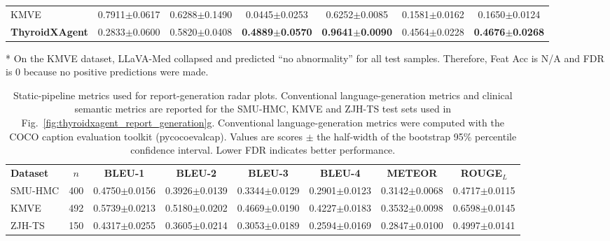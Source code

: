 \documentclass[fleqn,10pt]{wlscirep}
\begin{document}
\begin{appendices}
\begin{table}[p]
\begin{threeparttable}
\begin{tabular}{lcccccc}
KMVE~\cite{li_ultrasound_2024}
& 0.7911$\pm$0.0617
& 0.6288$\pm$0.1490
& 0.0445$\pm$0.0253
& 0.6252$\pm$0.0085
& 0.1581$\pm$0.0162
& 0.1650$\pm$0.0124 \\

\rowcolor{lightgray}
\textbf{ThyroidXAgent}
& 0.2833$\pm$0.0600
& 0.5820$\pm$0.0408
& \textbf{0.4889$\pm$0.0570}
& \textbf{0.9641$\pm$0.0090}
& 0.4564$\pm$0.0228
& \textbf{0.4676$\pm$0.0268} \\

\bottomrule
\end{tabular}

\begin{tablenotes}[flushleft]
\footnotesize
\item[*] On the KMVE dataset, LLaVA-Med collapsed and predicted
``no abnormality'' for all test samples. Therefore, Feat Acc is N/A
and FDR is 0 because no positive predictions were made.
\end{tablenotes}

\end{threeparttable}
\end{table}
\clearpage

\begin{table}[p]
\centering
\begin{threeparttable}

\caption{Static-pipeline metrics used for report-generation radar plots. Conventional language-generation metrics and clinical semantic metrics are reported for the SMU-HMC, KMVE and ZJH-TS test sets used in Fig.~\ref{fig:thyroidxagent_report_generation}g. Conventional language-generation metrics were computed with the COCO caption evaluation toolkit (pycocoevalcap). Values are scores $\pm$ the half-width of the bootstrap 95\% percentile confidence interval. Lower FDR indicates better performance.}
\label{tab:static_rule_controller_radar_metrics}

\scriptsize
\setlength{\tabcolsep}{4.2pt}
\renewcommand{\arraystretch}{1.10}

\begin{tabular}{lccccccc}
\toprule
\rowcolor{gray!20}
\multicolumn{8}{c}{\textbf{Conventional natural-language generation metrics}} \\
\midrule
\textbf{Dataset}
& \textbf{\(n\)}
& \textbf{BLEU-1}
& \textbf{BLEU-2}
& \textbf{BLEU-3}
& \textbf{BLEU-4}
& \textbf{METEOR}
& \textbf{ROUGE$_L$} \\
\midrule
SMU-HMC
& 400
& 0.4750$\pm$0.0156
& 0.3926$\pm$0.0139
& 0.3344$\pm$0.0129
& 0.2901$\pm$0.0123
& 0.3142$\pm$0.0068
& 0.4717$\pm$0.0115 \\
KMVE
& 492
& 0.5739$\pm$0.0213
& 0.5180$\pm$0.0202
& 0.4669$\pm$0.0190
& 0.4227$\pm$0.0183
& 0.3532$\pm$0.0098
& 0.6598$\pm$0.0145 \\
ZJH-TS
& 150
& 0.4317$\pm$0.0255
& 0.3605$\pm$0.0214
& 0.3053$\pm$0.0189
& 0.2594$\pm$0.0169
& 0.2847$\pm$0.0100
& 0.4997$\pm$0.0141 \\
\bottomrule
\end{tabular}


\end{threeparttable}
\end{table}
\end{appendices}
\end{document}
